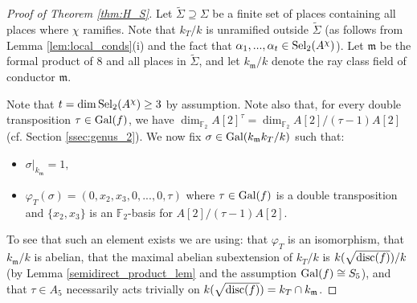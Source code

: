 \documentclass[10pt]{amsart}
\numberwithin{equation}{section}
\theoremstyle{remark}
\theoremstyle{definition}
\theoremstyle{definition}
\theoremstyle{definition}
\theoremstyle{definition}
\theoremstyle{definition}
\theoremstyle{definition}
\theoremstyle{definition}
\theoremstyle{definition}
\begin{document}
\begin{proof}[Proof of Theorem \ref{thm:H_S}]
Let $\widetilde{\Sigma}\supseteq \Sigma$ be a finite set of places containing all places where $\chi$ ramifies. Note that $k_T/k$ is unramified outside $\widetilde{\Sigma}$ (as follows from Lemma \ref{lem:local_conds}(i) and the fact that $\alpha_1,...,\alpha_t\in \textup{Sel}_2(A^\chi)$). Let $\mathfrak{m}$ be the formal product of $8$ and all places in $\widetilde{\Sigma}$, and let $k_\mathfrak{m}/k$ denote the ray class field of conductor $\mathfrak{m}$. 

Note that $t=\dim\textup{Sel}_2(A^\chi)\geq 3$ by assumption. Note also that, for every double transposition $\tau\in \textup{Gal}(f)$, we have $\dim_{\mathbb{F}_2} A[2]^\tau=\dim_{\mathbb{F}_2} A[2]/(\tau -1)A[2]$ (cf. Section \ref{ssec:genus_2}). We now fix $\sigma \in \textup{Gal}(k_\mathfrak{m}k_T/k)$ such that:
\begin{itemize}
\item $\sigma|_{k_\mathfrak{m}}=1,$
\item $\varphi_T(\sigma)=(0,x_2,x_3,0,...,0, \tau)$ where $\tau \in \textup{Gal}(f)$ is a double transposition and $\{x_2, x_3\}$ is an $\mathbb{F}_2$-basis for $A[2]/(\tau-1)A[2]$.  
\end{itemize}
To see that such an element exists we are using: that $\varphi_T$ is an isomorphism, that $k_\mathfrak{m}/k$ is abelian, that the maximal abelian subextension of $k_T/k$ is $k(\sqrt{\textup{disc}(f)})/k$ (by Lemma \ref{semidirect_product_lem}  and the assumption $\textup{Gal}(f)\cong S_5$), and that $\tau \in A_5$ necessarily acts trivially on $k(\sqrt{\textup{disc}(f)})= k_T\cap k_\mathfrak{m}$. 


\end{proof}
\end{document}

